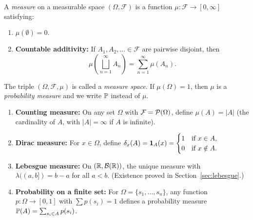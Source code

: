 \documentclass[11pt,a4paper]{article}
\begin{document}
\begin{definition}[Measure]
\label{def:measure}
A \emph{measure} on a measurable space $(\Omega, \mathcal{F})$ is a
function $\mu\colon \mathcal{F} \to [0, \infty]$ satisfying:
\begin{enumerate}[nosep,label=(\roman*)]
  \item $\mu(\emptyset) = 0$.
  \item \textbf{Countable additivity:} If $A_1, A_2, \ldots \in
    \mathcal{F}$ are pairwise disjoint, then
    \begin{equation}
      \mu\!\left(\bigsqcup_{n=1}^\infty A_n\right)
        = \sum_{n=1}^\infty \mu(A_n).
      \label{eq:countable_additivity}
    \end{equation}
\end{enumerate}
The triple $(\Omega, \mathcal{F}, \mu)$ is called a \emph{measure
space}. If $\mu(\Omega) = 1$, then $\mu$ is a \emph{probability
measure} and we write $\mathbb{P}$ instead of $\mu$.
\end{definition}

\begin{example}
\label{ex:standard_measures}
\begin{enumerate}[nosep,label=(\alph*)]
  \item \textbf{Counting measure:} On any set $\Omega$ with
    $\mathcal{F} = \mathcal{P}(\Omega)$, define $\mu(A) = |A|$ (the
    cardinality of $A$, with $|A| = \infty$ if $A$ is infinite).
  \item \textbf{Dirac measure:} For $x \in \Omega$, define
    $\delta_x(A) = \mathbf{1}_A(x) =
    \begin{cases} 1 & \text{if } x \in A, \\
    0 & \text{if } x \notin A. \end{cases}$
  \item \textbf{Lebesgue measure:} On $(\mathbb{R}, \mathcal{B}(\mathbb{R}))$, the unique
    measure with $\lambda((a, b]) = b - a$ for all $a < b$.
    (Existence proved in Section~\ref{sec:lebesgue}.)
  \item \textbf{Probability on a finite set:} For
    $\Omega = \{s_1, \ldots, s_n\}$, any function
    $p\colon \Omega \to [0,1]$ with $\sum p(s_i) = 1$ defines a
    probability measure $\mathbb{P}(A) = \sum_{s_i \in A} p(s_i)$.
\end{enumerate}
\end{example}
\end{document}
